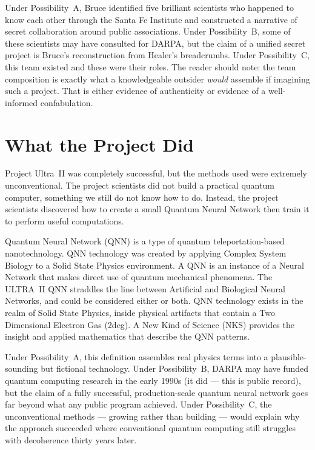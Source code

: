 Under Possibility~A, Bruce identified five brilliant scientists who happened to know each other through the Santa Fe Institute and constructed a narrative of secret collaboration around public associations. Under Possibility~B, some of these scientists may have consulted for DARPA, but the claim of a unified secret project is Bruce's reconstruction from Healer's breadcrumbs. Under Possibility~C, this team existed and these were their roles. The reader should note: the team composition is exactly what a knowledgeable outsider \textit{would} assemble if imagining such a project. That is either evidence of authenticity or evidence of a well-informed confabulation.

\section*{What the Project Did}
\label{pos21:what-the-project-did}


Project Ultra~II was completely successful, but the methods used were extremely unconventional. The project scientists did not build a practical quantum computer, something we still do not know how to do. Instead, the project scientists discovered how to create a small Quantum Neural Network then train it to perform useful computations.

Quantum Neural Network (QNN) is a type of quantum teleportation-based nanotechnology. QNN technology was created by applying Complex System Biology to a Solid State Physics environment. A QNN is an instance of a Neural Network that makes direct use of quantum mechanical phenomena. The ULTRA~II QNN straddles the line between Artificial and Biological Neural Networks, and could be considered either or both. QNN technology exists in the realm of Solid State Physics, inside physical artifacts that contain a Two Dimensional Electron Gas (\gls{2deg}). A New Kind of Science (NKS) provides the insight and applied mathematics that describe the QNN patterns.

Under Possibility~A, this definition assembles real physics terms into a plausible-sounding but fictional technology. Under Possibility~B, DARPA may have funded quantum computing research in the early 1990s (it did --- this is public record), but the claim of a fully successful, production-scale quantum neural network goes far beyond what any public program achieved. Under Possibility~C, the unconventional methods --- growing rather than building --- would explain why the approach succeeded where conventional quantum computing still struggles with decoherence thirty years later.

